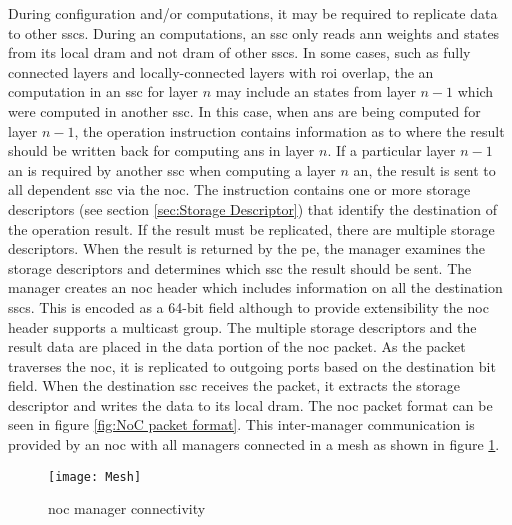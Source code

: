 During configuration and/or computations, it may be required to replicate data to other \acp{ssc}.
During \ac{an} computations, an \ac{ssc} only reads \ac{ann} weights and states from its local \ac{dram} and not \ac{dram} of other \acp{ssc}.
In some cases, such as fully connected layers and locally-connected layers with \ac{roi} overlap, the \ac{an} computation in an \ac{ssc} for layer $n$ may include \ac{an} states from layer $n-1$ which were computed in another \ac{ssc}.
In this case, when \acp{an} are being computed for layer $n-1$, the operation instruction contains information as to where the result should be written back for computing \acp{an} in layer $n$.
If a particular layer $n-1$ \ac{an} is required by another \ac{ssc} when computing a layer $n$ \ac{an}, the result is sent to all dependent \ac{ssc} via the \ac{noc}.
The instruction contains one or more storage descriptors (see section \ref{sec:Storage Descriptor}) that identify the destination of the operation result.
If the result must be replicated, there are multiple storage descriptors. When the result is returned by the \ac{pe}, the manager examines the storage descriptors and determines which \ac{ssc} the result should be sent.
The manager creates an \ac{noc} header which includes information on all the destination \acp{ssc}. 
This is encoded as a 64-bit field although to provide extensibility the \ac{noc} header supports a multicast group. 
The multiple storage descriptors and the result data are placed in the data portion of the \ac{noc} packet.
As the packet traverses the \ac{noc}, it is replicated to outgoing ports based on the destination bit field.
When the destination \ac{ssc} receives the packet, it extracts the storage descriptor and writes the data to its local \ac{dram}.
The \ac{noc} packet format can be seen in figure \ref{fig:NoC packet format}.
This inter-manager communication is provided by an \ac{noc} with all managers connected in a mesh as shown in figure \ref{fig:Mesh}.

\begin{figure}[!t]
\centering
\captionsetup{justification=centering}
\centerline{
\mbox{\texttt{[image: Mesh]}}
}
\caption{\ac{noc} manager connectivity}
\label{fig:Mesh}
\end{figure}

